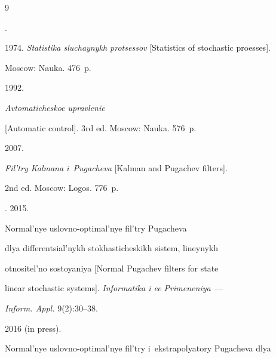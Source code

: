 {\small\frenchspacing


{%




\begin{thebibliography}{9} 







. 


1974. \textit{Statistika sluchaynykh protsessov} [Statistics of stochastic proesses]. 


Moscow: Nauka. 476~p.







 1992. 


\textit{Avtomaticheskoe upravlenie} 


[Automatic control]. 3rd ed. Moscow: Nauka. 576~p.







 2007.


\textit{Fil'try Kalmana i~Pugacheva} [Kalman and Pugachev filters]. 


2nd ed. Moscow: Logos. 776~p.







. 2015.


Normal'nye uslovno-optimal'nye fil'try Pugacheva 


dlya differentsial'nykh stokhasticheskikh sistem, lineynykh 


otnositel'no so\-sto\-yaniya [Normal Pugachev filters for state 


linear stochastic systems]. \textit{Informatika i ee Primeneniya}~---


\textit{Inform. Appl.}  9(2):30--38.







 2016 (in press). 


Normal'nye uslovno-optimal'nye fil'try i~ekstrapolyatory Pugacheva dlya 



\end{thebibliography}}}
